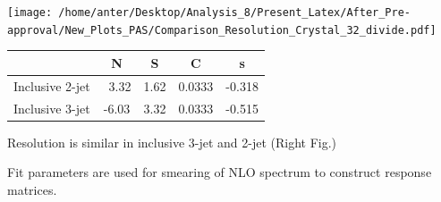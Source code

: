 \documentclass{beamer}
\begin{document}
\begin{frame}
\texttt{[image: /home/anter/Desktop/Analysis\_8/Present\_Latex/After\_Pre-approval/New\_Plots\_PAS/Comparison\_Resolution\_Crystal\_32\_divide.pdf]}\\
\vspace{2mm}
\begin{center}
\begin{table}[htbp]
\centering\scriptsize
\begin{tabular}{ccccc}
        \hline \hline
                 &    N    &  S   &    C   &    s   \\ \hline
Inclusive 2-jet  & ~3.32 & 1.62 & 0.0333 & -0.318  \\
Inclusive 3-jet  & -6.03 & 3.32 & 0.0333 & -0.515  \\
\hline \hline
           
\end{tabular}
\end{table}
\vspace{2mm}
\begin{itemize}
 {\scriptsize \item Resolution is similar in inclusive 3-jet and 2-jet (Right Fig.)
\vspace{2mm}
 \item Fit parameters are used for smearing of NLO spectrum to construct response matrices. \\ }
\end{itemize}
\end{center}
\end{frame}
\end{document}
